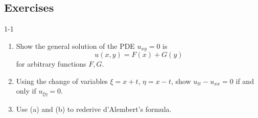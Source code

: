 \documentclass{article}
\numberwithin{equation}{section}
\begin{document}
	\subsection{Exercises}
	\begin{prb}{1-1}
		$ $\newline \vspace{-0.25cm}
		\begin{enumerate}[itemsep =-2pt,label = (\alph{*})]
			\item Show the general solution of the PDE $u_{xy} = 0$ is 
			\begin{equation*}
				u(x, y) = F(x) + G(y) 
			\end{equation*}
			for arbitrary functions $F, G$. 
			\item Using the change of variables $\xi = x + t$, $\eta = x - t$, show $u_{tt} - u_{xx} = 0$ if and only if $u_{\xi\eta} = 0$. 
			\item Use (a) and (b) to rederive d'Alembert's formula. 
		\end{enumerate}
	\end{prb}
\end{document}
